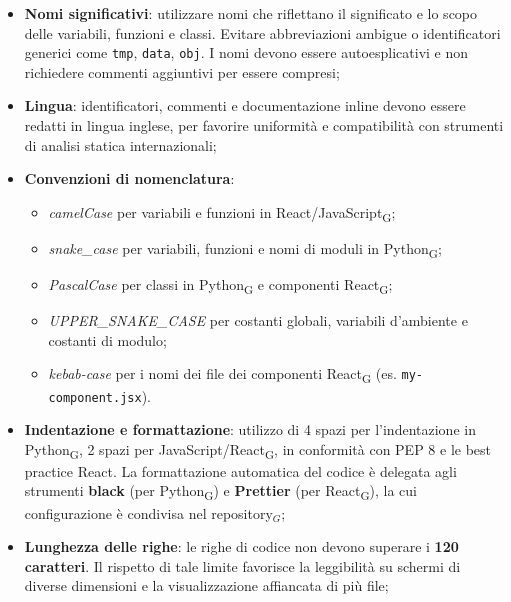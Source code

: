 \documentclass[a4paper, 10pt]{article}
\begin{document}
\begin{itemize}
    \item \textbf{Nomi significativi}: utilizzare nomi che riflettano il significato e lo scopo delle variabili, funzioni e classi. Evitare abbreviazioni ambigue o identificatori generici come \texttt{tmp}, \texttt{data}, \texttt{obj}. I nomi devono essere autoesplicativi e non richiedere commenti aggiuntivi per essere compresi;

    \item \textbf{Lingua}: identificatori, commenti e documentazione inline devono essere redatti in lingua inglese, per favorire uniformità e compatibilità con strumenti di analisi statica internazionali;

    \item \textbf{Convenzioni di nomenclatura}:
    \begin{itemize}
        \item \textit{camelCase} per variabili e funzioni in React/JavaScript\textsubscript{G};
        \item \textit{snake\_case} per variabili, funzioni e nomi di moduli in Python\textsubscript{G};
        \item \textit{PascalCase} per classi in Python\textsubscript{G} e componenti React\textsubscript{G};
        \item \textit{UPPER\_SNAKE\_CASE} per costanti globali, variabili d'ambiente e costanti di modulo;
        \item \textit{kebab-case} per i nomi dei file dei componenti React\textsubscript{G} (es. \texttt{my-component.jsx}).
    \end{itemize}

    \item \textbf{Indentazione e formattazione}: utilizzo di 4 spazi per l'indentazione in Python\textsubscript{G}, 2 spazi per JavaScript/React\textsubscript{G}, in conformità con PEP 8 e le best practice React. La formattazione automatica del codice è delegata agli strumenti \textbf{black} (per Python\textsubscript{G}) e \textbf{Prettier} (per React\textsubscript{G}), la cui configurazione è condivisa nel repository$_G$;

    \item \textbf{Lunghezza delle righe}: le righe di codice non devono superare i \textbf{120 caratteri}. Il rispetto di tale limite favorisce la leggibilità su schermi di diverse dimensioni e la visualizzazione affiancata di più file;


\end{itemize}
\end{document}
